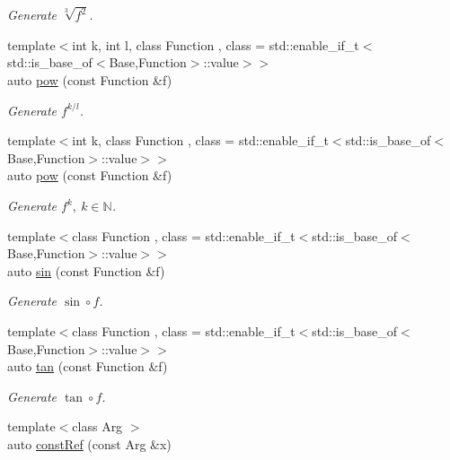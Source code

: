 \begin{DoxyCompactItemize}
\begin{DoxyCompactList}\small\item\em Generate $ \sqrt[3]{f^2}$. \end{DoxyCompactList}\item 
{\footnotesize template$<$int k, int l, class Function , class  = std\+::enable\+\_\+if\+\_\+t$<$std\+::is\+\_\+base\+\_\+of$<$\+Base,\+Function$>$\+::value$>$$>$ }\\auto \hyperlink{group__CMathGroup_gaecae6fa60bbfc0eb1867581ee4577d4e}{pow} (const Function \&f)
\begin{DoxyCompactList}\small\item\em Generate $ f^{k/l} $. \end{DoxyCompactList}\item 
{\footnotesize template$<$int k, class Function , class  = std\+::enable\+\_\+if\+\_\+t$<$std\+::is\+\_\+base\+\_\+of$<$\+Base,\+Function$>$\+::value$>$$>$ }\\auto \hyperlink{group__CMathGroup_gab52ffe2efd379aad7ea322de46103465}{pow} (const Function \&f)
\begin{DoxyCompactList}\small\item\em Generate $ f^k,\ k\in\mathbb{N}$. \end{DoxyCompactList}\item 
{\footnotesize template$<$class Function , class  = std\+::enable\+\_\+if\+\_\+t$<$std\+::is\+\_\+base\+\_\+of$<$\+Base,\+Function$>$\+::value$>$$>$ }\\auto \hyperlink{group__CMathGroup_ga663fdbe7a8977cba529c7c33981b7738}{sin} (const Function \&f)
\begin{DoxyCompactList}\small\item\em Generate $ \sin\circ f $. \end{DoxyCompactList}\item 
{\footnotesize template$<$class Function , class  = std\+::enable\+\_\+if\+\_\+t$<$std\+::is\+\_\+base\+\_\+of$<$\+Base,\+Function$>$\+::value$>$$>$ }\\auto \hyperlink{group__CMathGroup_gae03f57bd4efb4449ad1dc60cb74c742d}{tan} (const Function \&f)
\begin{DoxyCompactList}\small\item\em Generate $ \tan\circ f $. \end{DoxyCompactList}\item 
{\footnotesize template$<$class Arg $>$ }\\auto \hyperlink{namespaceFunG_abcfb38c2e995436816ea884803302f2d}{const\+Ref} (const Arg \&x)

\end{DoxyCompactItemize}
